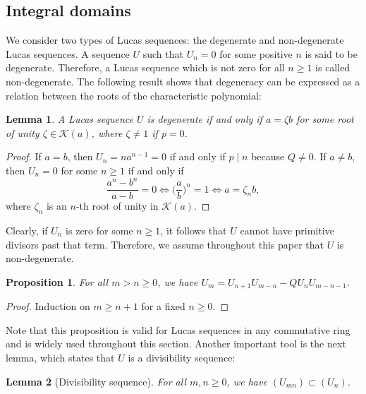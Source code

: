 \documentclass[reqno]{amsart}
\newtheorem{lemma}{Lemma}
\newtheorem{proposition}{Proposition}
\begin{document}
\subsection{Integral domains}

We consider two types of Lucas sequences: the degenerate and non-degenerate Lucas sequences. A sequence $U$ such that $U_n=0$ for some positive $n$ is said to be degenerate. Therefore, a Lucas sequence which is not zero for all $n\geq 1$ is called non-degenerate. The following result shows that degeneracy can be expressed as a relation between the roots of the characteristic polynomial:

\begin{lemma}\label{LemmaDegenerate}
    A Lucas sequence $U$ is degenerate if and only if $a=\zeta b$ for some root of unity $\zeta\in \mathscr{K}(a)$, where $\zeta\ne 1$ if $p=0$.
\end{lemma}

\begin{proof}
    If $a=b$, then $U_n=na^{n-1}=0$ if and only if $p\mid n$ because $Q\ne 0$. If $a\ne b$, then $U_n=0$ for some $n\geq 1$ if and only if
    \[
    \frac{a^n-b^n}{a-b} =0 \iff \bigg(\frac{a}{b}\bigg)^n = 1 \iff a=\zeta_n b,
    \]
    where $\zeta_n$ is an $n$-th root of unity in $\mathscr{K}(a)$.
\end{proof}

Clearly, if $U_n$ is zero for some $n\geq 1$, it follows that $U$ cannot have primitive divisors past that term. Therefore, we assume throughout this paper that $U$ is non-degenerate.


\begin{proposition}\label{PropUm+n}
    For all $m>n\geq 0$, we have $U_m = U_{n+1}U_{m-n} - QU_n U_{m-n-1}$.
\end{proposition}


\begin{proof}
    Induction on $m\geq n+1$ for a fixed $n\geq 0$.
\end{proof}

Note that this proposition is valid for Lucas sequences in any commutative ring and is widely used throughout this section. Another important tool is the next lemma, which states that $U$ is a divisibility sequence:

\begin{lemma}[Divisibility sequence]\label{LemmaDivSeq}
    For all $m,n\geq 0$, we have $(U_{mn})\subset (U_n)$.
\end{lemma}
\end{document}
